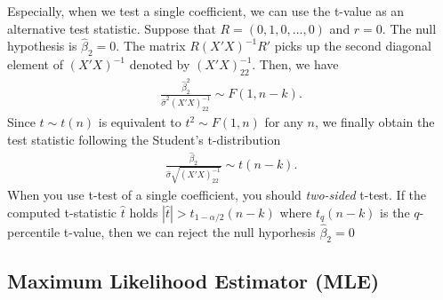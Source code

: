 \documentclass[
  12pt,
]{article}
\begin{document}
Especially, when we test a single coefficient, we can use the t-value as
an alternative test statistic. Suppose that \(R = (0, 1, 0, \ldots, 0)\)
and \(r = 0\). The null hypothesis is \(\hat{\beta}_2 = 0\). The matrix
\(R (X'X)^{-1} R'\) picks up the second diagonal element of
\((X'X)^{-1}\) denoted by \((X'X)^{-1}_{22}\). Then, we have
\begin{align*}
  \frac{\hat{\beta}_2^2}{\hat{\sigma}^2 (X'X)^{-1}_{22}} \sim F(1, n-k).
\end{align*} Since \(t \sim t(n)\) is equivalent to \(t^2 \sim F(1, n)\)
for any \(n\), we finally obtain the test statistic following the
Student's t-distribution \begin{align*}
  \frac{\hat{\beta}_2}{\hat{\sigma} \sqrt{(X'X)^{-1}_{22}}} \sim t(n - k).
\end{align*} When you use t-test of a single coefficient, you should
\emph{two-sided} t-test. If the computed t-statistic \(\hat{t}\) holds
\(|\hat{t}| > t_{1-\alpha/2}(n-k)\) where \(t_{q}(n-k)\) is the
\(q\)-percentile t-value, then we can reject the null hyporhesis
\(\hat{\beta}_2 = 0\)

\hypertarget{maximum-likelihood-estimator-mle}{%
\subsection{Maximum Likelihood Estimator
(MLE)}\label{maximum-likelihood-estimator-mle}}
\end{document}

